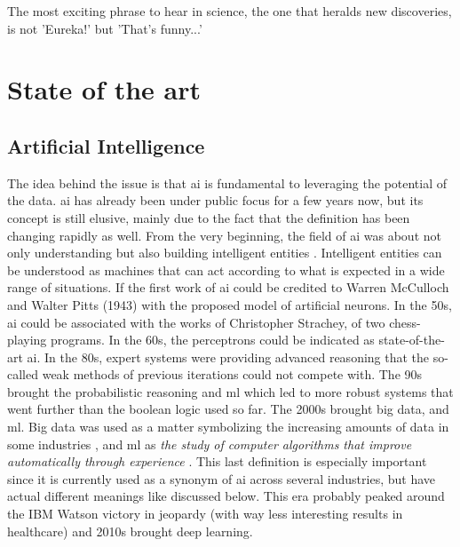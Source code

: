 \begin{savequote}[75mm]
The most exciting phrase to hear in science, the one that heralds new discoveries, is not 'Eureka!' but 'That's funny...'
\end{savequote}

\chapter{State of the art} \label{chap:sota}






\section{Artificial Intelligence}
The idea behind the issue is that \ac{ai} is fundamental to leveraging the potential of the data. \ac{ai} has already been under public focus for a few years now, but its concept is still elusive, mainly due to the fact that the definition has been changing rapidly as well.
From the very beginning, the field of \ac{ai} was about not only understanding but also building intelligent entities \cite{DBLP:books/aw/RN2020}.  Intelligent entities can be understood as machines that can act according to what is expected in a wide range of situations.
If the first work of \ac{ai} could be credited to Warren McCulloch and Walter Pitts (1943) with the proposed model of artificial neurons. In the 50s, \ac{ai} could be associated with the works of Christopher Strachey, of two chess-playing programs.
In the 60s, the perceptrons could be indicated as state-of-the-art \ac{ai}. In the 80s, expert systems were providing advanced reasoning that the so-called weak methods of previous iterations could not compete with.
The 90s brought the probabilistic reasoning and \ac{ml} which led to more robust systems that went further than the boolean logic used so far. The 2000s brought big data, and \ac{ml}. Big data was used as a matter symbolizing the increasing amounts of data in some industries \cite{dashBigDataHealthcare2019}, and \ac{ml} as \textit{ the study of computer algorithms that improve automatically through experience} \cite{mitchell1997machine}. This last definition is especially important since it is currently used as a synonym of \ac{ai} across several industries, but have actual different meanings like discussed below. This era probably peaked around the IBM Watson victory in jeopardy (with way less interesting results in healthcare) and 2010s brought deep learning. 
